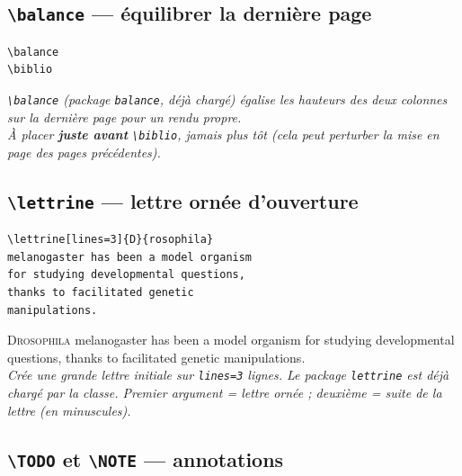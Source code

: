 \documentclass[12pt, a4paper]{article}
\begin{document}
\subsection{\texttt{\textbackslash balance} — équilibrer la dernière page}

\begin{demo}
\begin{lstlisting}[style=latexcode]
% Juste avant \biblio :
\balance
\biblio
\end{lstlisting}
\tcblower
{\footnotesize\itshape \texttt{\textbackslash balance} (package \texttt{balance}, déjà chargé) égalise les hauteurs des deux colonnes sur la dernière page pour un rendu propre.\\[6pt]
À placer \textbf{juste avant} \texttt{\textbackslash biblio}, jamais plus tôt (cela peut perturber la mise en page des pages précédentes).}
\end{demo}

\subsection{\texttt{\textbackslash lettrine} — lettre ornée d'ouverture}

\begin{demo}
\begin{lstlisting}[style=latexcode]
\lettrine[lines=3]{D}{rosophila}
melanogaster has been a model organism
for studying developmental questions,
thanks to facilitated genetic
manipulations.
\end{lstlisting}
\tcblower
\lettrine[lines=3]{D}{rosophila} melanogaster has been a model organism for studying developmental questions, thanks to facilitated genetic manipulations.\\[6pt]
{\footnotesize\itshape Crée une grande lettre initiale sur \texttt{lines=3} lignes. Le package \texttt{lettrine} est déjà chargé par la classe. Premier argument = lettre ornée ; deuxième = suite de la lettre (en minuscules).}
\end{demo}

\newpage

\subsection[\texttt{\textbackslash TODO} et \texttt{\textbackslash NOTE} — annotations]{\texttt{\textbackslash TODO} et \texttt{\textbackslash NOTE} — annotations}
\end{document}
